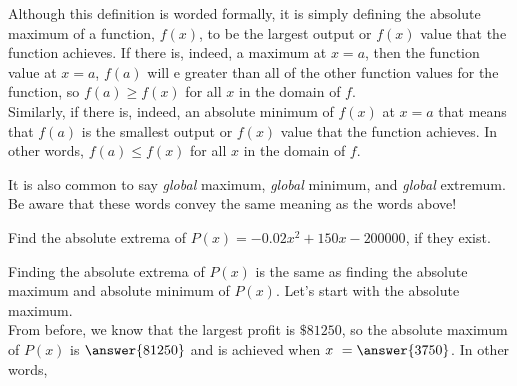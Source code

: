 \documentclass{ximera}
\begin{document}
\begin{explanation}
Although this definition is worded formally, it is simply defining the absolute maximum of a function, $f(x)$, to be the largest output or $f(x)$ value that the function achieves.  If there is, indeed, a maximum at $x=a$, then the function value at $x=a$, $f(a)$ will e greater than all of the other function values for the function, so $f(a) \geq f(x)$ for all $x$ in the domain of $f$.  \\

Similarly, if there is, indeed, an absolute minimum of $f(x)$ at $x=a$ that means that $f(a)$ is the smallest output or $f(x)$ value that the function achieves.  In other words, $f(a) \leq f(x)$ for all $x$ in the domain of $f$. \\
\end{explanation}

\begin{warning}
It is also common to say \textit{global} maximum, \textit{global} minimum, and \textit{global} extremum.  Be aware that these words convey the same meaning as the words above! 
\end{warning}

\begin{example}
Find the absolute extrema of $P(x) = -0.02x^2 + 150x-200000$, if they exist. 
\begin{explanation}
Finding the absolute extrema of $P(x)$ is the same as finding the absolute maximum and absolute minimum of $P(x)$.  Let's start with the absolute maximum.  \\

From before, we know that the largest profit is $\$81250$, so the absolute maximum of $P(x)$ is $\answer{81250}$ and is achieved when $x \ = \answer{3750}$.  In other words, 
\end{explanation}

\end{example}
\end{document}
